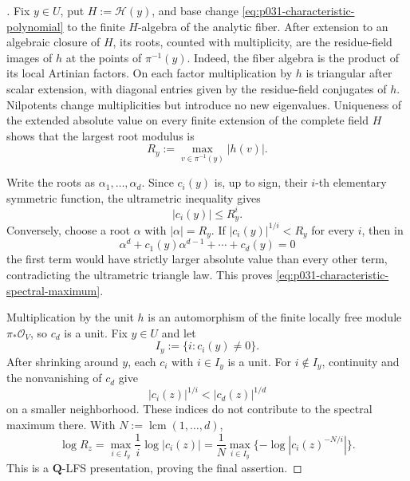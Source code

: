 
\begin{proof}[]
Fix $y\in U$, put $H:=\mathcal H(y)$, and base change
\eqref{eq:p031-characteristic-polynomial} to the finite $H$-algebra of the
analytic fiber.  After extension to an algebraic closure of $H$, its roots,
counted with multiplicity, are the residue-field images of $h$ at the points
of $\pi^{-1}(y)$.  Indeed, the fiber algebra is the product of its local
Artinian factors.  On each factor multiplication by $h$ is triangular after
scalar extension, with diagonal entries given by the residue-field
conjugates of $h$.  Nilpotents change multiplicities but introduce no new
eigenvalues.  Uniqueness of the extended absolute value on every finite
extension of the complete field $H$ shows that the largest root modulus is
\[
                       R_y:=\max_{v\in\pi^{-1}(y)}|h(v)|.
\]

Write the roots as $\alpha_1,\ldots,\alpha_d$.  Since $c_i(y)$ is, up to
sign, their $i$-th elementary symmetric function, the ultrametric inequality
gives
\[
                           |c_i(y)|\leq R_y^i.
\]
Conversely, choose a root $\alpha$ with $|\alpha|=R_y$.  If
$|c_i(y)|^{1/i}<R_y$ for every $i$, then in
\[
       \alpha^d+c_1(y)\alpha^{d-1}+\cdots+c_d(y)=0
\]
the first term would have strictly larger absolute value than every other
term, contradicting the ultrametric triangle law.  This proves
\eqref{eq:p031-characteristic-spectral-maximum}.

Multiplication by the unit $h$ is an automorphism of the finite locally free
module $\pi_*\mathcal O_V$, so $c_d$ is a unit.  Fix $y\in U$ and let
\[
                         I_y:=\{i:c_i(y)\ne0\}.
\]
After shrinking around $y$, each $c_i$ with $i\in I_y$ is a unit.  For
$i\notin I_y$, continuity and the nonvanishing of $c_d$ give
\[
                 |c_i(z)|^{1/i}<|c_d(z)|^{1/d}
\]
on a smaller neighborhood.  These indices do not contribute to the
spectral maximum there.  With $N:=\operatorname{lcm}(1,\ldots,d)$,
\begin{equation}
\label{eq:p031-local-characteristic-lfs-formula}
 \log R_z
  =\max_{i\in I_y}\frac1i\log|c_i(z)|
  =\frac1N\max_{i\in I_y}
       \{-\log|c_i(z)^{-N/i}|\}.
\end{equation}
This is a $\mathbf Q$-LFS presentation, proving the final assertion.
\end{proof}

